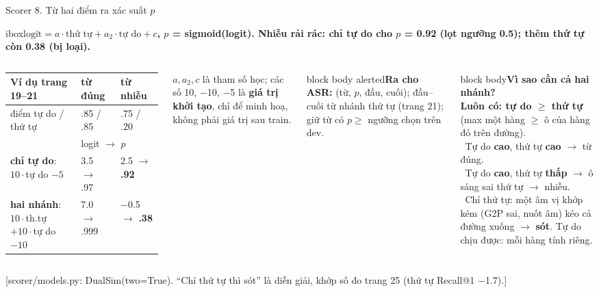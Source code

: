 \documentclass[aspectratio=169,xcolor=table]{beamer}
\newcommand{\bad}[1]{\textcolor{RiskRed}{\textbf{#1}}}
\newcommand{\good}[1]{\textcolor{GoodGreen}{\textbf{#1}}}
\newcommand{\src}[1]{\par\vfill{\tiny\color{TextGray}[#1]}}
\newcommand{\ra}{$\rightarrow$}
\newcommand{\nbox}[2][block body]{\begin{beamercolorbox}[sep=0.45em,rounded=true]{#1}\footnotesize #2\end{beamercolorbox}}
\newcommand{\nb}[1]{\textcolor{Accent}{#1}}
\newcommand{\insight}[1]{\begin{beamercolorbox}[sep=0.55em,rounded=true]{ibox}\small\bfseries #1\end{beamercolorbox}\vspace{0.15cm}}
\begin{document}
\begin{frame}{Scorer 8. Từ hai điểm ra xác suất $p$}
\insight{$\text{logit} = a\cdot\text{thứ tự} + a_2\cdot\text{tự do} + c$, $p$ = sigmoid(logit). Nhiễu rải rác: chỉ tự do cho \nb{$p$ = 0.92} (lọt ngưỡng 0.5); thêm thứ tự còn \nb{0.38} (bị loại).}
\begin{columns}[T]
\renewcommand{\arraystretch}{1.1}\scriptsize\setlength{\tabcolsep}{3pt}
\begin{tabular}{L{3.3cm}L{1.6cm}L{1.6cm}}
\toprule
Ví dụ trang 19--21 & \textbf{từ đúng} & \textbf{từ nhiễu} \\
\midrule
điểm tự do / thứ tự & .85 / .85 & .75 / .20 \\
\midrule
& \multicolumn{2}{l}{logit \ra{} $p$} \\
\midrule
\textbf{chỉ tự do}: $10\cdot$tự do $- 5$ & 3.5 \ra{} .97 & 2.5 \ra{} \bad{.92} \\
\textbf{hai nhánh}: $10\cdot$th.tự $+ 10\cdot$tự do $- 10$ & 7.0 \ra{} .999 & $-$0.5 \ra{} \good{.38} \\
\bottomrule
\end{tabular}
\par\vspace{0.06cm}
{\tiny $a, a_2, c$ là tham số học; các số 10, $-$10, $-$5 là \textbf{giá trị khởi tạo}, chỉ để minh hoạ, không phải giá trị sau train.\par}
\vspace{0.08cm}
\nbox[block body alerted]{\scriptsize\textbf{Ra cho ASR:} (từ, $p$, đầu, cuối); đầu--cuối từ nhánh thứ tự (trang 21); giữ từ có $p \geq$ ngưỡng chọn trên dev.}
\nbox{\textbf{Vì sao cần cả hai nhánh?}\\[2pt]\scriptsize
\textbf{Luôn có: tự do $\geq$ thứ tự} (max một hàng $\geq$ ô của hàng đó trên đường).\\[1pt]
\textbullet\ Tự do \textbf{cao}, thứ tự \textbf{cao} \ra{} từ đúng.\\
\textbullet\ Tự do \textbf{cao}, thứ tự \textbf{thấp} \ra{} ô sáng sai thứ tự \ra{} nhiễu.\\
\textbullet\ Chỉ thứ tự: một âm vị khớp kém (G2P sai, nuốt âm) kéo cả đường xuống \ra{} \textbf{sót}. Tự do chịu được: mỗi hàng tính riêng.}
\end{columns}
\src{scorer/models.py: DualSim(two=True). ``Chỉ thứ tự thì sót'' là diễn giải, khớp số đo trang 25 (thứ tự Recall@1 $-$1.7).}
\end{frame}
\end{document}
